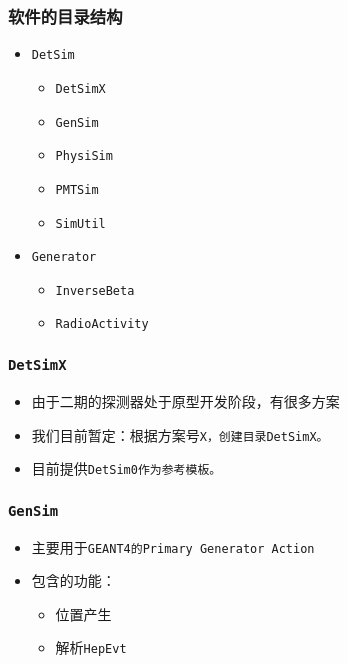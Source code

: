 \begin{frame}
    \frametitle{软件的目录结构}
    \begin{itemize}    
        \item \tt{DetSim}
            \begin{itemize}
                \item \tt{DetSimX}
                \item \tt{GenSim}
                \item \tt{PhysiSim}
                \item \tt{PMTSim}
                \item \tt{SimUtil}
            \end{itemize}
        \item \tt{Generator}
            \begin{itemize}
                \item \tt{InverseBeta}
                \item \tt{RadioActivity}
            \end{itemize}
    \end{itemize}
\end{frame}

\begin{frame}
    \frametitle{\tt{DetSimX}}
    \begin{itemize}    
        \item 由于二期的探测器处于原型开发阶段，有很多方案
        \item 我们目前暂定：根据方案号\tt{X}，创建目录\tt{DetSimX}。
        \item 目前提供\tt{DetSim0}作为参考模板。
    \end{itemize}

\end{frame}

\begin{frame}
    \frametitle{\tt{GenSim}}
    \begin{itemize}    
        \item 主要用于\tt{GEANT4}的\tt{Primary Generator Action}
        \item 包含的功能：
            \begin{itemize}    
                \item 位置产生
                \item 解析\tt{HepEvt}
            \end{itemize}
    \end{itemize}
\end{frame}

